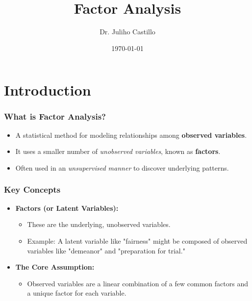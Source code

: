 \documentclass[aspectratio=169]{beamer}
\title{Factor Analysis}
\author{Dr. Juliho Castillo}
\institute{Tecnológico de Monterrey}
\date{\today}
\begin{document}
\begin{frame}
    \titlepage
\end{frame}

\begin{frame}
    \tableofcontents
\end{frame}


\section{Introduction}

\begin{frame}[fragile]
    \frametitle{What is Factor Analysis?}
    \begin{itemize}
        \item A statistical method for modeling relationships among \textbf{observed variables}. \pause
        \item It uses a smaller number of \textit{unobserved variables}, known as \textbf{factors}. \pause
        \item Often used in an \textit{unsupervised manner} to discover underlying patterns.
    \end{itemize}
\end{frame}

\begin{frame}[fragile]
    \frametitle{Key Concepts}
    \begin{itemize}
        \item \textbf{Factors (or Latent Variables):} \pause
              \begin{itemize}
                  \item These are the underlying, unobserved variables. \pause
                  \item Example: A latent variable like "fairness" might be composed of observed variables like "demeanor" and "preparation for trial."
              \end{itemize}
        \item \textbf{The Core Assumption:} \pause
              \begin{itemize}
                  \item Observed variables are a linear combination of a few common factors and a unique factor for each variable.
              \end{itemize}
    \end{itemize}
\end{frame}
\end{document}
